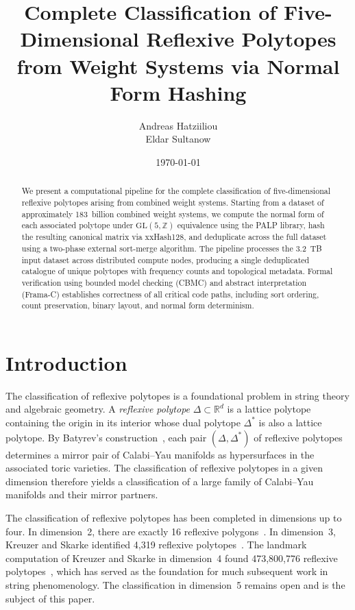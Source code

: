 \documentclass[12pt,a4paper]{article}
\title{%
  Complete Classification of Five-Dimensional Reflexive Polytopes\\
  from Weight Systems via Normal Form Hashing
}
\author{
  Andreas Hatziiliou%
  \\
  Eldar Sultanow
}
\date{\today}
\theoremstyle{definition}
\newcommand{\ZZ}{\mathbb{Z}}
\newcommand{\RR}{\mathbb{R}}
\newcommand{\GL}{\mathrm{GL}}
\begin{document}
\maketitle

\begin{abstract}
We present a computational pipeline for the complete classification of
five-dimensional reflexive polytopes arising from combined weight systems.
Starting from a dataset of approximately 183~billion combined weight
systems, we compute the normal form of each associated polytope under
$\GL(5,\ZZ)$ equivalence using the PALP library, hash the resulting
canonical matrix via xxHash128, and deduplicate across the full dataset
using a two-phase external sort-merge algorithm.  The pipeline processes
the 3.2~TB input dataset across distributed compute nodes, producing a
single deduplicated catalogue of unique polytopes with frequency counts
and topological metadata.  Formal verification using bounded model
checking (CBMC) and abstract interpretation (Frama-C) establishes
correctness of all critical code paths, including sort ordering,
count preservation, binary layout, and normal form determinism.

\end{abstract}

\section{Introduction}
\label{sec:intro}

The classification of reflexive polytopes is a foundational problem in
string theory and algebraic geometry.  A \emph{reflexive polytope}
$\Delta \subset \RR^d$ is a lattice polytope containing the origin in its
interior whose dual polytope $\Delta^*$ is also a lattice polytope.  By
Batyrev's construction~\cite{Batyrev1994}, each pair $(\Delta, \Delta^*)$
of reflexive polytopes determines a mirror pair of Calabi--Yau manifolds
as hypersurfaces in the associated toric varieties.  The classification
of reflexive polytopes in a given dimension therefore yields a
classification of a large family of Calabi--Yau manifolds and their
mirror partners.

The classification of reflexive polytopes has been completed in dimensions
up to four.  In dimension~2, there are exactly 16 reflexive
polygons~\cite{Koelman1991}.  In dimension~3, Kreuzer and Skarke
identified 4,319 reflexive polytopes~\cite{KreuzerSkarke1998}.  The
landmark computation of Kreuzer and Skarke in dimension~4 found
473,800,776 reflexive polytopes~\cite{KreuzerSkarke2000}, which has
served as the foundation for much subsequent work in string
phenomenology.  The classification in dimension~5 remains open and is the
subject of this paper.
\end{document}
